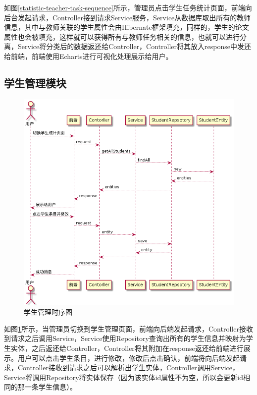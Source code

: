如图\ref{statistic-teacher-task-sequence}所示，管理员点击学生任务统计页面，前端向后台发起请求，Controller接到请求Service服务，Service从数据库取出所有的教师信息，其中与教师关联的学生属性会由Hibernate框架填充，同样的，学生的论文属性也会被填充，这样就可以获得所有与教师任务相关的信息，也就可以进行分离，Service将分类后的数据返还给Controller，Controller将其放入response中发还给前端，前端使用Echarts进行可视化处理展示给用户。

\subsection{学生管理模块}

\begin{figure}
    \centering
    \includegraphics[scale = 0.6]{out/uml/时序图/manage-student-sequence/manage-student-sequence.png}
    \caption{\song\wuhao 学生管理时序图}
    \label{manage-student-sequence}
\end{figure}

如图\ref{manage-student-sequence}所示，当管理员切换到学生管理页面，前端向后端发起请求，Controller接收到请求之后调用Service，Service使用Repository查询出所有的学生信息并映射为学生实体，之后返还给Controller，Controller将其附加在response返还给前端进行展示。用户可以点击学生条目，进行修改，修改后点击确认，前端将向后端发起请求，Controller接收到请求之后可以解析出学生实体，Controller调用Service，Service将调用Repository将实体保存（因为该实体id属性不为空，所以会更新id相同的那一条学生信息）。

